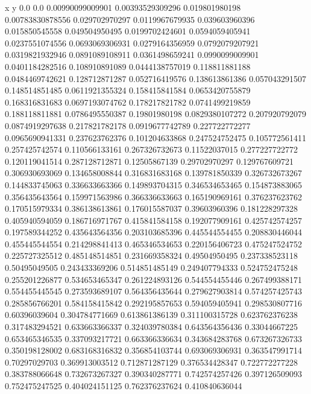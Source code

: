               x                y
            0.0              0.0
0.00990099009901  0.00393529309296
 0.019801980198  0.00783830878556
 0.029702970297  0.0119967679935
 0.039603960396   0.015850545558
 0.049504950495  0.0199702424601
0.0594059405941  0.0237551074556
0.0693069306931  0.0279164356959
0.0792079207921  0.0319821932946
0.0891089108911  0.0361498659241
0.0990099009901  0.0401184282516
 0.108910891089  0.0444138757019
 0.118811881188  0.0484469742621
 0.128712871287   0.052716419576
 0.138613861386   0.057043291507
 0.148514851485  0.0611921355324
 0.158415841584  0.0653420755879
 0.168316831683  0.0697193074762
 0.178217821782  0.0741499219859
 0.188118811881  0.0786495550387
  0.19801980198  0.0829380107272
 0.207920792079  0.0874919297638
 0.217821782178  0.0919677742789
 0.227722772277  0.0965690941331
 0.237623762376   0.101204633868
 0.247524752475   0.105772561411
 0.257425742574   0.110566133161
 0.267326732673    0.11522037015
 0.277227722772   0.120119041514
 0.287128712871    0.12505867139
  0.29702970297   0.129767609721
 0.306930693069   0.134658008844
 0.316831683168   0.139781850339
 0.326732673267   0.144833745063
 0.336633663366   0.149893704315
 0.346534653465   0.154873883065
 0.356435643564   0.159971563986
 0.366336633663   0.165190969161
 0.376237623762   0.170515979334
 0.386138613861   0.176015587037
  0.39603960396   0.181228297328
 0.405940594059   0.186716971767
 0.415841584158   0.192077909161
 0.425742574257   0.197589344252
 0.435643564356   0.203103685396
 0.445544554455   0.208830446044
 0.455445544554   0.214298841413
 0.465346534653   0.220156406723
 0.475247524752   0.225727325512
 0.485148514851   0.231669358324
  0.49504950495   0.237338523118
  0.50495049505   0.243433369206
 0.514851485149   0.249407794333
 0.524752475248   0.255201226877
 0.534653465347   0.261224893126
 0.544554455446   0.267499388171
 0.554455445545   0.273593689107
 0.564356435644   0.279627903814
 0.574257425743   0.285856766201
 0.584158415842   0.292195857653
 0.594059405941   0.298530807716
  0.60396039604   0.304784771669
 0.613861386139   0.311100315728
 0.623762376238   0.317483294521
 0.633663366337   0.324039780384
 0.643564356436    0.33044667225
 0.653465346535   0.337093217721
 0.663366336634   0.343684283768
 0.673267326733   0.350198128002
 0.683168316832   0.356854103744
 0.693069306931   0.363547991714
  0.70297029703   0.369913003512
 0.712871287129   0.376534428347
 0.722772277228   0.383788066648
 0.732673267327   0.390340287771
 0.742574257426   0.397126509093
 0.752475247525   0.404024151125
 0.762376237624   0.410840636044
